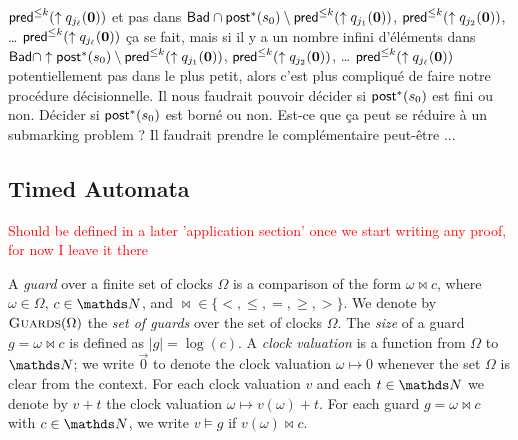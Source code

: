 {$\textsf{pred}^{\leq k}(\uparrow q_{j_\ell}(\textbf{0}))$
et pas dans
$ \textsf{Bad} \cap  \textsf{post}^*(s_0)  \setminus \textsf{pred}^{\leq k}(\uparrow q_{j_1}(\textbf{0}))$, $\textsf{pred}^{\leq k}(\uparrow q_{j_2}(\textbf{0}))$, \ldots
$\textsf{pred}^{\leq k}(\uparrow q_{j_\ell}(\textbf{0}))$
ça se fait,
mais si il y a un nombre infini d'éléments dans
$ \textsf{Bad} \cap \uparrow \textsf{post}^*(s_0)  \setminus \textsf{pred}^{\leq k}(\uparrow q_{j_1}(\textbf{0}))$, $\textsf{pred}^{\leq k}(\uparrow q_{j_2}(\textbf{0}))$, \ldots
$\textsf{pred}^{\leq k}(\uparrow q_{j_\ell}(\textbf{0}))$
potentiellement pas dans le plus petit,
alors c'est plus compliqué de faire notre procédure décisionnelle.
Il nous faudrait pouvoir décider si $\textsf{post}^*(s_0)$ est fini ou non.
Décider si $\textsf{post}^*(s_0)$ est borné ou non.
Est-ce que ça peut se réduire à un submarking problem ?
Il faudrait prendre le complémentaire peut-être ...}




%
\iffalse
%
\subsection{Timed Automata}

\textcolor{red}{Should be defined in a later 'application section' once we start writing any proof, for now I leave it there} 

\renewcommand{\A}{\mathcal{A}}
\newcommand{\B}{\mathcal{B}}
\renewcommand{\C}{\mathcal{C}}
\newcommand{\Const}{\mathsf{Consts}}
\newcommand{\Conf}{\mathsf{Conf}}
\newcommand{\guards}{{\textsc{Guards}}}


A {\em guard} over a finite set of clocks $\Omega$ 
is a comparison of the form
$\omega \bowtie c$, where $ \omega \in \Omega$, $c \in \N$,
and $\bowtie\in\{<,\leq,=,\geq,>\}$.
%
We denote by $\guards(\Omega)$ the {\em set of guards} over the set of 
clocks $\Omega$.
The {\em size} %
 of a guard 
$g=\omega \bowtie c$ is defined as %
$|g|=\log(c)$.
A {\em clock valuation} is a function from $\Omega$ to $\N$;
we write $\vec{0}$ to denote the clock valuation $\omega \mapsto 0$
whenever the set $\Omega$ is clear from the context.
For each clock valuation $v$ and each $t\in\N$ we denote
by $v+t$ the clock valuation $\omega \mapsto v(\omega)+t$.
%
For each guard $g=\omega \bowtie c$ with $c\in\N$,
we write $v\models g$ if $v(\omega)\bowtie c$.

